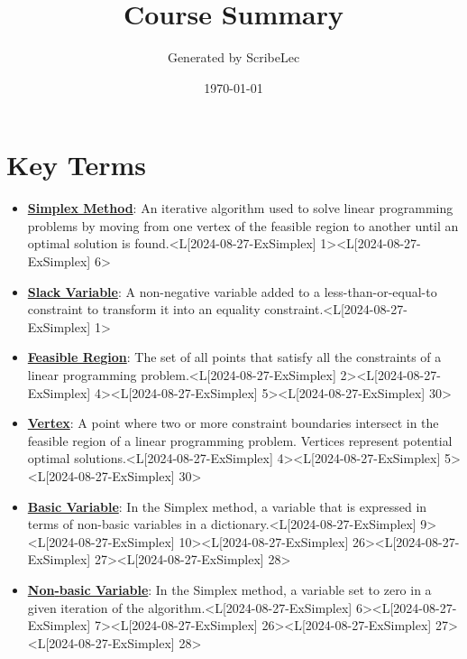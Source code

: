 \documentclass{article}%
\title{Course Summary}%
\author{Generated by ScribeLec}%
\date{\today}%
\begin{document}
%
\normalsize%
\maketitle%
\tableofcontents\newpage%
\section{Key Terms}%
\label{sec:KeyTerms}%
\begin{itemize}[[leftmargin=*]]%
\item \href{https://www.math.purdue.edu/~yipn/421/2024-08-27-ExSimplex.pdf#page=1}{\textbf{Simplex Method}}: An iterative algorithm used to solve linear programming problems by moving from one vertex of the feasible region to another until an optimal solution is found.<L[2024-08-27-ExSimplex] 1><L[2024-08-27-ExSimplex] 6>%
\item \href{https://www.math.purdue.edu/~yipn/421/2024-08-27-ExSimplex.pdf#page=1}{\textbf{Slack Variable}}: A non-negative variable added to a less-than-or-equal-to constraint to transform it into an equality constraint.<L[2024-08-27-ExSimplex] 1>%
\item \href{https://www.math.purdue.edu/~yipn/421/2024-08-27-ExSimplex.pdf#page=2}{\textbf{Feasible Region}}: The set of all points that satisfy all the constraints of a linear programming problem.<L[2024-08-27-ExSimplex] 2><L[2024-08-27-ExSimplex] 4><L[2024-08-27-ExSimplex] 5><L[2024-08-27-ExSimplex] 30>%
\item \href{https://www.math.purdue.edu/~yipn/421/2024-08-27-ExSimplex.pdf#page=4}{\textbf{Vertex}}: A point where two or more constraint boundaries intersect in the feasible region of a linear programming problem. Vertices represent potential optimal solutions.<L[2024-08-27-ExSimplex] 4><L[2024-08-27-ExSimplex] 5><L[2024-08-27-ExSimplex] 30>%
\item \href{https://www.math.purdue.edu/~yipn/421/2024-08-27-ExSimplex.pdf#page=9}{\textbf{Basic Variable}}: In the Simplex method, a variable that is expressed in terms of non-basic variables in a dictionary.<L[2024-08-27-ExSimplex] 9><L[2024-08-27-ExSimplex] 10><L[2024-08-27-ExSimplex] 26><L[2024-08-27-ExSimplex] 27><L[2024-08-27-ExSimplex] 28>%
\item \href{https://www.math.purdue.edu/~yipn/421/2024-08-27-ExSimplex.pdf#page=6}{\textbf{Non{-}basic Variable}}: In the Simplex method, a variable set to zero in a given iteration of the algorithm.<L[2024-08-27-ExSimplex] 6><L[2024-08-27-ExSimplex] 7><L[2024-08-27-ExSimplex] 26><L[2024-08-27-ExSimplex] 27><L[2024-08-27-ExSimplex] 28>%

\end{itemize}
\end{document}

